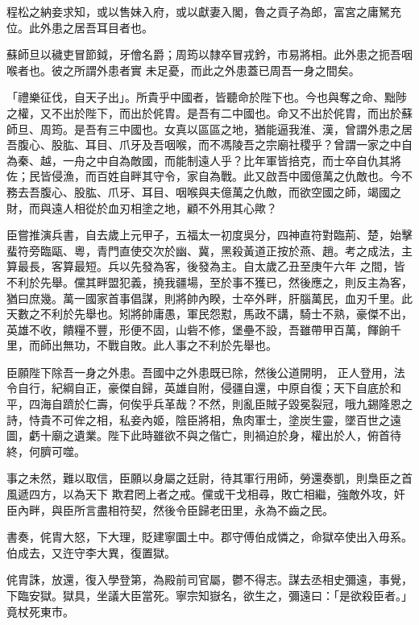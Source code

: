 \begin{pinyinscope}
 程松之納妾求知，或以售妹入府，或以獻妻入閣，魯之貢子為郎，富宮之庸駑充位。此外患之居吾耳目者也。



 蘇師旦以穢吏冒節鉞，牙儈名爵；周筠以隸卒冒戎鈐，市易將相。此外患之扼吾咽喉者也。彼之所謂外患者實
 未足憂，而此之外患蓋已周吾一身之間矣。



 「禮樂征伐，自天子出」。所貴乎中國者，皆聽命於陛下也。今也與奪之命、黜陟之權，又不出於陛下，而出於侂胄。是吾有二中國也。命又不出於侂胄，而出於蘇師旦、周筠。是吾有三中國也。女真以區區之地，猶能逼我淮、漢，曾謂外患之居吾腹心、股肱、耳目、爪牙及吾咽喉，而不馮陵吾之宗廟社稷乎？曾謂一家之中自為秦、越，一舟之中自為敵國，而能制遠人乎？比年軍皆掊克，而士卒自仇其將
 佐；民皆侵漁，而百姓自畔其守令，家自為戰。此又啟吾中國億萬之仇敵也。今不務去吾腹心、股肱、爪牙、耳目、咽喉與夫億萬之仇敵，而欲空國之師，竭國之財，而與遠人相從於血刃相塗之地，顧不外用其心歟？



 臣嘗推演兵書，自去歲上元甲子，五福太一初度吳分，四神直符對臨荊、楚，始擊蜚符旁臨甌、粵，青門直使交次於幽、冀，黑殺黃道正按於燕、趙。考之成法，主算最長，客算最短。兵以先發為客，後發為主。自太歲乙丑至庚午六年
 之間，皆不利於先舉。儻其畔盟犯義，撓我疆場，至於事不獲已，然後應之，則反主為客，猶曰庶幾。萬一國家首事倡謀，則將帥內睽，士卒外畔，肝腦萬民，血刃千里。此天數之不利於先舉也。矧將帥庸愚，軍民怨懟，馬政不講，騎士不熟，豪傑不出，英雄不收，饋糧不豐，形便不固，山砦不修，堡壘不設，吾雖帶甲百萬，餫餉千里，而師出無功，不戰自敗。此人事之不利於先舉也。



 臣願陛下除吾一身之外患。吾國中之外患既已除，然後公道開明，
 正人登用，法令自行，紀綱自正，豪傑自歸，英雄自附，侵疆自還，中原自復；天下自底於和平，四海自躋於仁壽，何俟乎兵革哉？不然，則亂臣賊子毀冕裂冠，哦九錫隆恩之詩，恃貴不可侔之相，私妾內姬，陰臣將相，魚肉軍士，塗炭生靈，墜百世之遠圖，虧十廟之遺業。陛下此時雖欲不與之偕亡，則禍迫於身，權出於人，俯首待終，何臍可噬。



 事之未然，難以取信，臣願以身屬之廷尉，待其軍行用師，勞還奏凱，則梟臣之首風遞四方，以為天下
 欺君罔上者之戒。儻或干戈相尋，敗亡相繼，強敵外攻，奸臣內畔，與臣所言盡相符契，然後令臣歸老田里，永為不齒之民。



 書奏，侂胄大怒，下大理，貶建寧圜土中。郡守傅伯成憐之，命獄卒使出入毋系。伯成去，又迕守李大異，復置獄。



 侂胄誅，放還，復入學登第，為殿前司官屬，鬱不得志。謀去丞相史彌遠，事覺，下臨安獄。獄具，坐議大臣當死。寧宗知嶽名，欲生之，彌遠曰：「是欲殺臣者。」竟杖死東市。




\end{pinyinscope}
